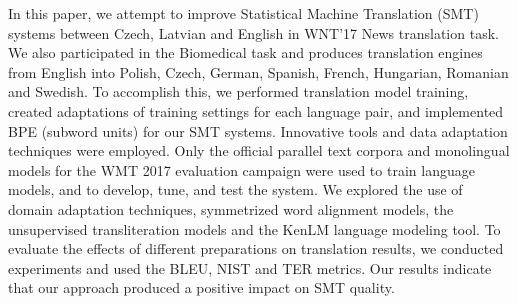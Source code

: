 In this paper, we attempt to improve Statistical Machine Translation (SMT) systems between Czech, Latvian and English in WNT'17 News translation task. We also participated in the Biomedical task and produces translation engines from English into Polish, Czech, German, Spanish, French, Hungarian, Romanian and Swedish. To accomplish this, we performed translation model training, created adaptations of training settings for each language pair, and implemented BPE (subword units) for our SMT systems. Innovative tools and data adaptation techniques were employed. Only the official parallel text corpora and monolingual models for the WMT 2017 evaluation campaign were used to train language models, and to develop, tune, and test the system. We explored the use of domain adaptation techniques, symmetrized word alignment models, the unsupervised transliteration models and the KenLM language modeling tool. To evaluate the effects of different preparations on translation results, we conducted experiments and used the BLEU, NIST and TER metrics. Our results indicate that our approach produced a positive impact on SMT quality.
